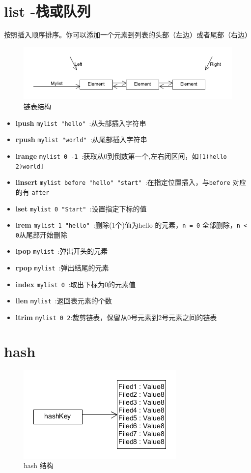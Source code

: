 \documentclass[UTF8,a4paper,12pt]{ctexbook}
\begin{document}
	\section{list -栈或队列}
		按照插入顺序排序。你可以添加一个元素到列表的头部（左边）或者尾部（右边）
		
		\begin{figure}[H]
			\centering
			\includegraphics[scale=0.76]{list}
			\caption{链表结构}
		\end{figure}
		\begin{itemize}
			\item \textbf{lpush} \verb|mylist "hello" |:从头部插入字符串
			\item \textbf{rpush} \verb|mylist "world" |:从尾部插入字符串
			\item \textbf{lrange} \verb|mylist 0 -1 |:获取从0到倒数第一个,左右闭区间，如\verb|[1)hello 2)world]|
			\item \textbf{linsert} \verb|mylist before "hello" "start" |:在指定位置插入，与\verb|before| 对应的有 \verb|after|
			\item \textbf{lset} \verb|mylist 0 "Start" |:设置指定下标的值
			\item \textbf{lrem} \verb|mylist 1 "hello" |:删除(1个)值为hello 的元素，\verb|n = 0| 全部删除，\verb|n < 0|从尾部开始删除
			\item \textbf{lpop} \verb|mylist |:弹出开头的元素
			\item \textbf{rpop} \verb|mylist |:弹出结尾的元素
			\item \textbf{index} \verb|mylist 0 |:取出下标为0的元素值
			\item \textbf{llen} \verb|mylist |:返回表元素的个数
			\item \textbf{ltrim} \verb|mylist 0 2|:裁剪链表，保留从0号元素到2号元素之间的链表
		\end{itemize}
		
	\section{hash}
		\begin{figure}[H]
			\centering
			\includegraphics[scale=1]{hash}
			\caption{hash 结构}
		\end{figure}
		
\end{document}

